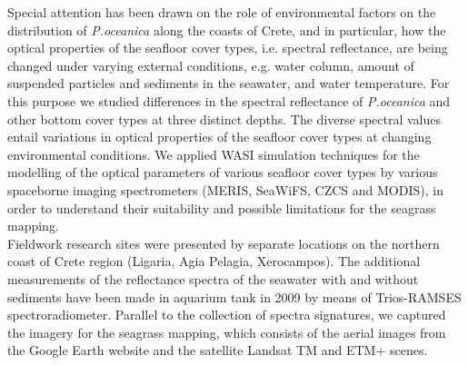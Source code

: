 \documentclass[11pt]{article}
\begin{document}
Special attention has been drawn on the role of environmental factors on the distribution of \textit{P.oceanica} along the coasts of Crete, and in particular, how the optical properties of the seafloor cover types, i.e. spectral reflectance, are being changed under varying external conditions, e.g. water column, amount of suspended particles and sediments in the seawater, and water temperature. For this purpose we studied differences in the spectral reflectance of \textit{P.oceanica} and other bottom cover types at three distinct depths. The diverse spectral values entail variations in optical properties of the seafloor cover types at changing environmental conditions. We applied \ac{WASI} simulation techniques for the modelling of the optical parameters of various seafloor cover types by various spaceborne imaging spectrometers (\ac{MERIS}, \ac{SeaWiFS}, \ac{CZCS} and \ac{MODIS}), in order to understand their suitability and possible limitations for the seagrass mapping.\\
Fieldwork research sites were presented by separate locations on the northern coast of Crete region (Ligaria, Agia Pelagia, Xerocampos). The additional measurements of the reflectance spectra of the seawater with and without sediments have been made in aquarium tank in 2009 by means of Trios-RAMSES spectroradiometer. Parallel to the collection of spectra signatures, we captured the imagery for the seagrass mapping, which consists of the aerial images from the Google Earth website and the satellite Landsat TM and ETM+ scenes. 

\pagebreak
\end{document}
